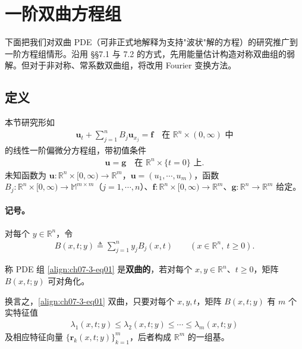 \documentclass[../../main.tex]{subfiles}
\begin{document}
\section{一阶双曲方程组}\label{section:ch07-一阶双曲方程组}

下面把我们对双曲 PDE（可非正式地解释为支持"波状"解的方程）的研究推广到一阶方程组情形。沿用 \S\S7.1 与 7.2 的方式，先用能量估计构造对称双曲组的弱解。但对于非对称、常系数双曲组，将改用 Fourier 变换方法。

\subsection{定义}\label{subsection:ch07-3-1-定义}

本节研究形如
\begin{align}
\mathbf{u}_t+\sum_{j=1}^n B_j\mathbf{u}_{x_j}=\mathbf{f}\quad\text{在 }\mathbb{R}^n\times(0,\infty)\text{ 中}\label{align:ch07-3-eq01}
\end{align}
的线性一阶偏微分方程组，带初值条件
\begin{align}
\mathbf{u}=\mathbf{g}\quad\text{在 }\mathbb{R}^n\times\{t=0\}\text{ 上}.\label{align:ch07-3-eq02}
\end{align}
未知函数为 $\mathbf{u}:\mathbb{R}^n\times[0,\infty)\to\mathbb{R}^m$，$\mathbf{u}=(u_1,\cdots,u_m)$，函数 $B_j:\mathbb{R}^n\times[0,\infty)\to\mathbb{M}^{m\times m}$（$j=1,\cdots,n$）、$\mathbf{f}:\mathbb{R}^n\times[0,\infty)\to\mathbb{R}^m$、$\mathbf{g}:\mathbb{R}^n\to\mathbb{R}^m$ 给定。

\paragraph{记号。}对每个 $y\in\mathbb{R}^n$，令
\begin{align*}
B(x,t;y)\triangleq\sum_{j=1}^n y_jB_j(x,t)\qquad (x\in\mathbb{R}^n,\ t\geqslant 0).
\end{align*}

\begin{definition}\label{definition:ch07-3-双曲组}
称 PDE 组 \eqref{align:ch07-3-eq01} 是\textbf{双曲的}，若对每个 $x,y\in\mathbb{R}^n$、$t\geqslant 0$，矩阵 $B(x,t;y)$ 可对角化。
\end{definition}

换言之，\eqref{align:ch07-3-eq01} 双曲，只要对每个 $x,y,t$，矩阵 $B(x,t;y)$ 有 $m$ 个实特征值
\begin{align*}
\lambda_1(x,t;y)\leqslant\lambda_2(x,t;y)\leqslant\cdots\leqslant\lambda_m(x,t;y)
\end{align*}
及相应特征向量 $\{\mathbf{r}_k(x,t;y)\}_{k=1}^m$，后者构成 $\mathbb{R}^m$ 的一组基。
\end{document}
